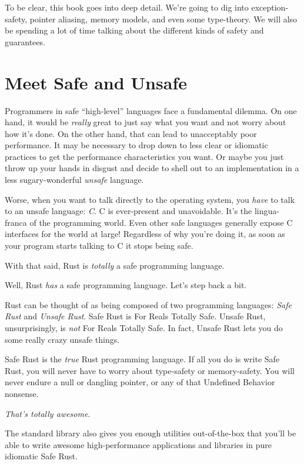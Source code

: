 \documentclass[a4paper,]{book}
\begin{document}
To be clear, this book goes into deep detail. We're going to dig into
exception-safety, pointer aliasing, memory models, and even some
type-theory. We will also be spending a lot of time talking about the
different kinds of safety and guarantees.

\chapter{Meet Safe and Unsafe}\label{sec--meet-safe-and-unsafe}

Programmers in safe ``high-level'' languages face a fundamental dilemma.
On one hand, it would be \emph{really} great to just say what you want
and not worry about how it's done. On the other hand, that can lead to
unacceptably poor performance. It may be necessary to drop down to less
clear or idiomatic practices to get the performance characteristics you
want. Or maybe you just throw up your hands in disgust and decide to
shell out to an implementation in a less sugary-wonderful \emph{unsafe}
language.

Worse, when you want to talk directly to the operating system, you
\emph{have} to talk to an unsafe language: \emph{C}. C is ever-present
and unavoidable. It's the lingua-franca of the programming world. Even
other safe languages generally expose C interfaces for the world at
large! Regardless of why you're doing it, as soon as your program starts
talking to C it stops being safe.

With that said, Rust is \emph{totally} a safe programming language.

Well, Rust \emph{has} a safe programming language. Let's step back a
bit.

Rust can be thought of as being composed of two programming languages:
\emph{Safe Rust} and \emph{Unsafe Rust}. Safe Rust is For Reals Totally
Safe. Unsafe Rust, unsurprisingly, is \emph{not} For Reals Totally Safe.
In fact, Unsafe Rust lets you do some really crazy unsafe things.

Safe Rust is the \emph{true} Rust programming language. If all you do is
write Safe Rust, you will never have to worry about type-safety or
memory-safety. You will never endure a null or dangling pointer, or any
of that Undefined Behavior nonsense.

\emph{That's totally awesome.}

The standard library also gives you enough utilities out-of-the-box that
you'll be able to write awesome high-performance applications and
libraries in pure idiomatic Safe Rust.
\end{document}
